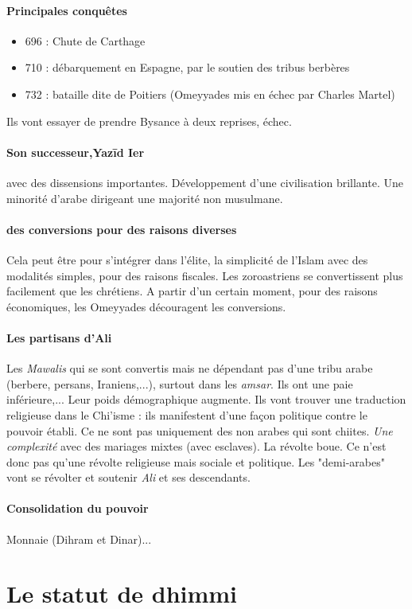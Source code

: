 \paragraph{Principales conquêtes}
\begin{itemize}
   \item 	696 : Chute de Carthage
\item 	710 : débarquement en Espagne, par le soutien des tribus berbères
\item 	732 : bataille dite de Poitiers (Omeyyades mis en échec par Charles Martel)
\end{itemize}
Ils vont essayer de prendre Bysance à deux reprises, échec.

\paragraph{Son successeur,Yazīd Ier} avec des dissensions importantes. Développement d'une civilisation brillante. Une minorité d'arabe dirigeant une majorité non musulmane.

\paragraph{des conversions pour des raisons diverses} Cela peut être pour s'intégrer dans l'élite, la simplicité de l'Islam avec des modalités simples, pour des raisons fiscales. Les zoroastriens se convertissent plus facilement que les chrétiens. 
A partir d'un certain moment, pour des raisons économiques, les Omeyyades découragent les conversions. 

\paragraph{Les partisans d'Ali} Les \textit{Mawalis} qui se sont convertis mais ne dépendant pas d'une tribu arabe (berbere, persans, Iraniens,...), surtout dans les \textit{amsar}. Ils ont une paie inférieure,... Leur poids démographique augmente. Ils vont trouver une traduction religieuse dans le Chi'isme : ils manifestent d'une façon politique contre le pouvoir établi. Ce ne sont pas uniquement des non arabes qui sont chiites. \textit{Une complexité} avec des mariages mixtes (avec esclaves). La révolte boue. 
Ce n'est donc pas qu'une révolte religieuse mais sociale et politique. Les "demi-arabes" vont se révolter et soutenir \textit{Ali} et ses descendants. 

\paragraph{Consolidation du pouvoir} Monnaie (Dihram et Dinar)... 


\section{Le statut de dhimmi}

